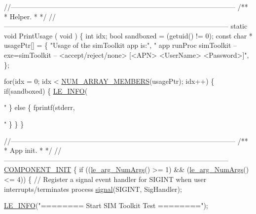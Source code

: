 \begin{DoxyCodeInclude}
{{{{\textcolor{comment}{//--------------------------------------------------------------------------------------------------}\textcolor{comment}{}
\textcolor{comment}{/**}
\textcolor{comment}{ * Helper.}
\textcolor{comment}{ *}
\textcolor{comment}{ */}
\textcolor{comment}{//--------------------------------------------------------------------------------------------------}
\textcolor{keyword}{static} \textcolor{keywordtype}{void} PrintUsage
(
    \textcolor{keywordtype}{void}
)
\{
    \textcolor{keywordtype}{int} idx;
    \textcolor{keywordtype}{bool} sandboxed = (getuid() != 0);
    \textcolor{keyword}{const} \textcolor{keywordtype}{char} * usagePtr[] =
    \{
            \textcolor{stringliteral}{"Usage of the simToolkit app is:"},
            \textcolor{stringliteral}{"   app runProc simToolkit --exe=simToolkit -- <accept/reject/none> [<APN> <UserName>
       <Password>]"},
    \};

    \textcolor{keywordflow}{for}(idx = 0; idx < \hyperlink{le__basics_8h_a8d8f28a045f43b477cafb67a99894c07}{NUM\_ARRAY\_MEMBERS}(usagePtr); idx++)
    \{
        \textcolor{keywordflow}{if}(sandboxed)
        \{
            \hyperlink{le__log_8h_a23e6d206faa64f612045d688cdde5808}{LE\_INFO}(\textcolor{stringliteral}{"%
        \}
        \textcolor{keywordflow}{else}
        \{
            fprintf(stderr, \textcolor{stringliteral}{"%
        \}
    \}
\}

\textcolor{comment}{//--------------------------------------------------------------------------------------------------}\textcolor{comment}{}
\textcolor{comment}{/**}
\textcolor{comment}{ * App init.}
\textcolor{comment}{ *}
\textcolor{comment}{ */}
\textcolor{comment}{//--------------------------------------------------------------------------------------------------}
\hyperlink{le__event_loop_8h_abdb9187a56836a93d19cc793cbd4b7ec}{COMPONENT\_INIT}
\{
    \textcolor{keywordflow}{if} ((\hyperlink{le__args_8h_a6fbbeb423104e6eb92fe47ef42b7310a}{le\_arg\_NumArgs}() >= 1) && (\hyperlink{le__args_8h_a6fbbeb423104e6eb92fe47ef42b7310a}{le\_arg\_NumArgs}() <= 4))
    \{
        \textcolor{comment}{// Register a signal event handler for SIGINT when user interrupts/terminates process}
        \hyperlink{wifi_ap_test_8c_a8db34e235c60f54c3df89f2b6b8ca3ed}{signal}(SIGINT, SigHandler);

        \hyperlink{le__log_8h_a23e6d206faa64f612045d688cdde5808}{LE\_INFO}(\textcolor{stringliteral}{"======== Start SIM Toolkit Test ========"});

}}}}}}
\end{DoxyCodeInclude}
